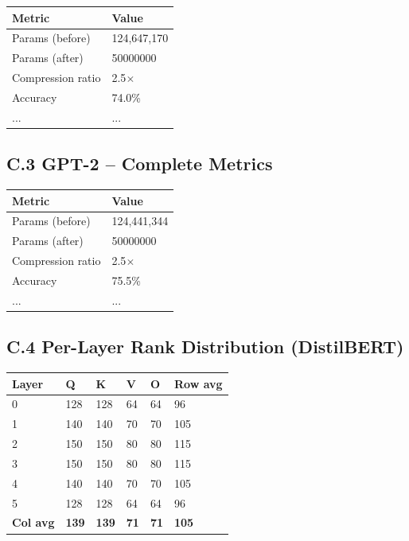 \begin{table}[H]
\centering
\small
\begin{tabular}{ll}
\toprule
\textbf{Metric} & \textbf{Value} \\
\midrule
Params (before) & 124,647,170 \\
Params (after) & 50000000 \\
Compression ratio & 2.5$\times$ \\
Accuracy & 74.0\% \\
... & ... \\
\bottomrule
\end{tabular}
\end{table}

\subsection{C.3 GPT-2 -- Complete Metrics}

\begin{table}[H]
\centering
\small
\begin{tabular}{ll}
\toprule
\textbf{Metric} & \textbf{Value} \\
\midrule
Params (before) & 124,441,344 \\
Params (after) & 50000000 \\
Compression ratio & 2.5$\times$ \\
Accuracy & 75.5\% \\
... & ... \\
\bottomrule
\end{tabular}
\end{table}

\subsection{C.4 Per-Layer Rank Distribution (DistilBERT)}

\begin{table}[H]
\centering
\small
\begin{tabular}{llllll}
\toprule
\textbf{Layer} & \textbf{Q} & \textbf{K} & \textbf{V} & \textbf{O} & \textbf{Row avg} \\
\midrule
0 & 128 & 128 & 64 & 64 & 96 \\
1 & 140 & 140 & 70 & 70 & 105 \\
2 & 150 & 150 & 80 & 80 & 115 \\
3 & 150 & 150 & 80 & 80 & 115 \\
4 & 140 & 140 & 70 & 70 & 105 \\
5 & 128 & 128 & 64 & 64 & 96 \\
\textbf{Col avg} & \textbf{139} & \textbf{139} & \textbf{71} & \textbf{71} & \textbf{105} \\
\bottomrule
\end{tabular}
\end{table}


